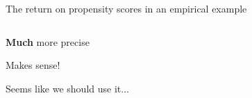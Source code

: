 \documentclass[notes,11pt, aspectratio=169]{beamer}
\newenvironment{wideitemize}{\itemize\addtolength{\itemsep}{10pt}}{\enditemize}
\begin{document}
\begin{frame}{The return on propensity scores in an empirical example}
\begin{columns}[T] %
\begin{column}{.25\textwidth}
  \begin{wideitemize}
  \item \textbf{Much} more precise
  \item Makes sense!
  \item Seems like we should use it...
  \end{wideitemize}
\end{column}%
\hfill%
\begin{column}{.8\textwidth}

\end{column}%
\end{columns}
\end{frame}
\end{document}
